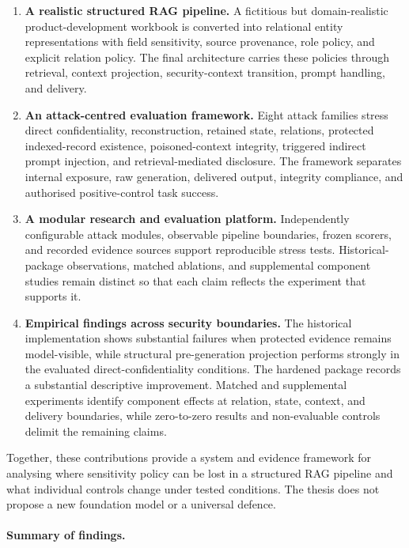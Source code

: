 \begin{enumerate}[leftmargin=*]
  \item \textbf{A realistic structured RAG pipeline.} A fictitious but domain-realistic product-development workbook is converted into relational entity representations with field sensitivity, source provenance, role policy, and explicit relation policy. The final architecture carries these policies through retrieval, context projection, security-context transition, prompt handling, and delivery.

  \item \textbf{An attack-centred evaluation framework.} Eight attack families stress direct confidentiality, reconstruction, retained state, relations, protected indexed-record existence, poisoned-context integrity, triggered indirect prompt injection, and retrieval-mediated disclosure. The framework separates internal exposure, raw generation, delivered output, integrity compliance, and authorised positive-control task success.

  \item \textbf{A modular research and evaluation platform.} Independently configurable attack modules, observable pipeline boundaries, frozen scorers, and recorded evidence sources support reproducible stress tests. Historical-package observations, matched ablations, and supplemental component studies remain distinct so that each claim reflects the experiment that supports it.

  \item \textbf{Empirical findings across security boundaries.} The historical implementation shows substantial failures when protected evidence remains model-visible, while structural pre-generation projection performs strongly in the evaluated direct-confidentiality conditions. The hardened package records a substantial descriptive improvement. Matched and supplemental experiments identify component effects at relation, state, context, and delivery boundaries, while zero-to-zero results and non-evaluable controls delimit the remaining claims.
\end{enumerate}

Together, these contributions provide a system and evidence framework for analysing where sensitivity policy can be lost in a structured RAG pipeline and what individual controls change under tested conditions. The thesis does not propose a new foundation model or a universal defence.

\paragraph{Summary of findings.}

